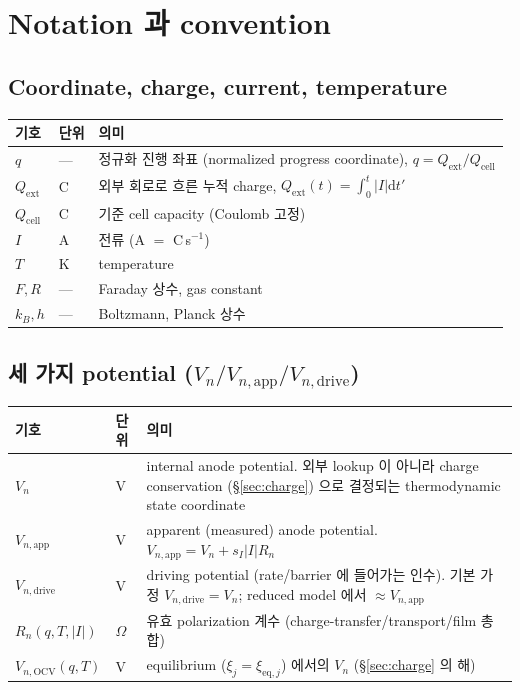 \documentclass[11pt,a4paper]{article}
\newcommand{\dd}{\mathrm{d}}
\newcommand{\eq}{\mathrm{eq}}
\newcommand{\app}{\mathrm{app}}
\newcommand{\dimedrive}{\mathrm{drive}}
\newcommand{\OCV}{\mathrm{OCV}}
\newcommand{\cell}{\mathrm{cell}}
\newcommand{\ext}{\mathrm{ext}}
\begin{document}
\section{Notation 과 convention}\label{sec:notation}
\subsection{Coordinate, charge, current, temperature}\label{sec:notation_basic}
\begin{longtable}{p{} p{} p{}}
\toprule 기호 & 단위 & 의미 \\ \midrule \endhead
$q$ & --- & 정규화 진행 좌표 (normalized progress coordinate), $q=Q_\ext/Q_\cell$ \\
$Q_\ext$ & C & 외부 회로로 흐른 누적 charge, $Q_\ext(t)=\int_0^t|I|\dd t'$ \\
$Q_\cell$ & C & 기준 cell capacity (Coulomb 고정) \\
$I$ & A & 전류 (A $=$ C\,s$^{-1}$) \\
$T$ & K & temperature \\
$F,R$ & --- & Faraday 상수, gas constant \\
$k_B,h$ & --- & Boltzmann, Planck 상수 \\
\bottomrule
\end{longtable}

\subsection{세 가지 potential ($V_n / V_{n,\app} / V_{n,\dimedrive}$)}\label{sec:notation_pot}
\begin{longtable}{p{} p{} p{}}
\toprule 기호 & 단위 & 의미 \\ \midrule \endhead
$V_n$ & V & internal anode potential. 외부 lookup 이 아니라 charge conservation
  (\S\ref{sec:charge}) 으로 결정되는 thermodynamic state coordinate \\
$V_{n,\app}$ & V & apparent (measured) anode potential. $V_{n,\app}=V_n+s_I|I|R_n$ \\
$V_{n,\dimedrive}$ & V & driving potential (rate/barrier 에 들어가는 인수). 기본
  가정 $V_{n,\dimedrive}=V_n$; reduced model 에서 $\approx V_{n,\app}$ \\
$R_n(q,T,|I|)$ & $\Omega$ & 유효 polarization 계수 (charge-transfer/transport/film 총합) \\
$V_{n,\OCV}(q,T)$ & V & equilibrium ($\xi_j=\xi_{\eq,j}$) 에서의 $V_n$ (\S\ref{sec:charge} 의 해) \\
\bottomrule
\end{longtable}
\end{document}
